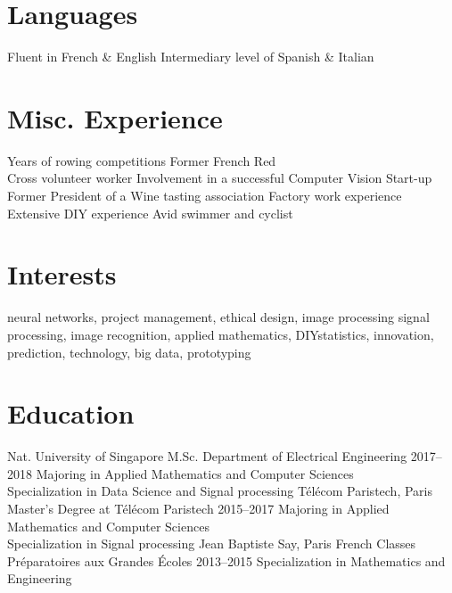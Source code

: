 \documentclass[]{source}
\begin{document}
\begin{aside}
\section{Languages}
\vspace{0.6cm}
Fluent in
\vspace{0.3cm}
French \& English
\vspace{0.3cm}
Intermediary level of
\vspace{0.3cm}
Spanish \& Italian 
\section{Misc. Experience}
\vspace{0.6cm}
Years of rowing competitions
\vspace{0.3cm}
Former French Red \\
Cross volunteer worker
\vspace{0.3cm}
Involvement in a successful Computer Vision Start-up
\vspace{0.3cm}
Former President of a Wine tasting association
\vspace{0.3cm}
Factory work experience
\vspace{0.3cm}
Extensive DIY experience
\vspace{0.3cm}
Avid swimmer and cyclist
\end{aside}
\section{Interests}
neural networks, project management, ethical design, image processing\newline
signal processing, image recognition, applied mathematics, DIY\newline statistics, innovation, prediction, technology, big data, prototyping
\bigskip
\section{Education}
\begin{entrylist}
\bigskip
\entry
{\footnotesize{Nat. University of Singapore}}
{M.Sc. Department of Electrical Engineering}
{2017–2018}
{Majoring in Applied Mathematics and Computer Sciences\\
Specialization in Data Science and Signal processing }
\bigskip
\entry
{\footnotesize{Télécom Paristech, Paris}}
{Master's Degree at Télécom Paristech}
{2015–2017}
{Majoring in Applied Mathematics and Computer Sciences\\
Specialization in Signal processing}
\entry
{\footnotesize{Jean Baptiste Say, Paris}}
{French Classes Préparatoires aux Grandes Écoles}
{2013–2015}
{Specialization in Mathematics and Engineering }
\end{entrylist}
\end{document}
